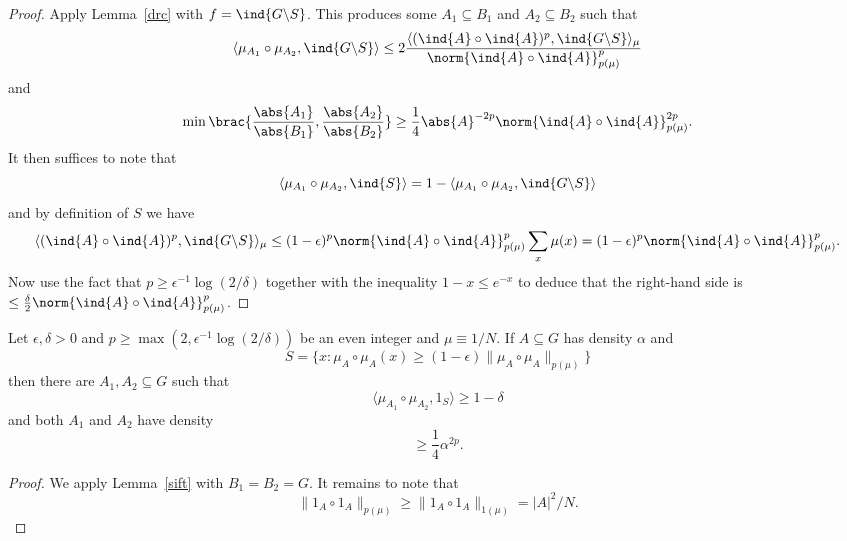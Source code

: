 \begin{proof}
\leanok
Apply Lemma~\ref{drc} with $f=\ind{G\backslash S}$. This produces some $A_1\subseteq B_1$ and $A_2\subseteq B_2$ such that
\[\langle \mu_{A_1}\circ \mu_{A_2}, \ind{G\backslash S}\rangle\leq 2\frac{\langle (\ind{A}\circ \ind{A})^p,\ind{G\backslash S}\rangle_\mu}{\norm{\ind{A}\circ \ind{A}}_{p(\mu)}^p}\]
and
\[\min\brac{\frac{\abs{A_1}}{\abs{B_1}},\frac{\abs{A_2}}{\abs{B_2}}}\geq \frac{1}{4}\abs{A}^{-2p}\norm{\ind{A}\circ \ind{A}}_{p(\mu)}^{2p}.\]
It then suffices to note that
\[\langle \mu_{A_1}\circ \mu_{A_2},\ind{S}\rangle=1-\langle \mu_{A_1}\circ \mu_{A_2},\ind{G\backslash S}\rangle\]
and by definition of $S$ we have
\[\langle (\ind{A}\circ \ind{A})^p,\ind{G\backslash S}\rangle_\mu\leq (1-\epsilon)^p\norm{\ind{A}\circ \ind{A}}_{p(\mu)}^p\sum_{x}\mu(x)=(1-\epsilon)^p\norm{\ind{A}\circ \ind{A}}_{p(\mu)}^p.\]
Now use the fact that $p\geq \epsilon^{-1}\log(2/\delta)$ together with the inequality $1-x\leq e^{-x}$ to deduce that the right-hand side is $\leq \tfrac{\delta}{2}\norm{\ind{A}\circ \ind{A}}_{p(\mu)}^p$.
\end{proof}


\begin{corollary}\label{sift_cor}
\leanok
Let $\epsilon,\delta>0$ and $p\geq \max(2,\epsilon^{-1}\log(2/\delta))$ be an even integer and $\mu\equiv 1/N$. If $A\subseteq G$ has density $\alpha$ and
\[S = \{ x : \mu_A\circ \mu_A(x) \geq (1-\epsilon)\| \mu_A\circ \mu_A\|_{p(\mu)}\}\]
then there are $A_1,A_2\subseteq G$ such that
\[\langle \mu_{A_1}\circ \mu_{A_2}, 1_S\rangle \geq 1-\delta\]
and both $A_1$ and $A_2$ have density
\[\geq \frac{1}{4}\alpha^{2p}.\]
\end{corollary}

\begin{proof}
\leanok
We apply Lemma~\ref{sift} with $B_1=B_2=G$. It remains to note that
\[\| 1_A\circ 1_A\|_{p(\mu)}\geq \| 1_A\circ 1_A\|_{1(\mu)}=\lvert A\rvert^2/N.\]
\end{proof}

